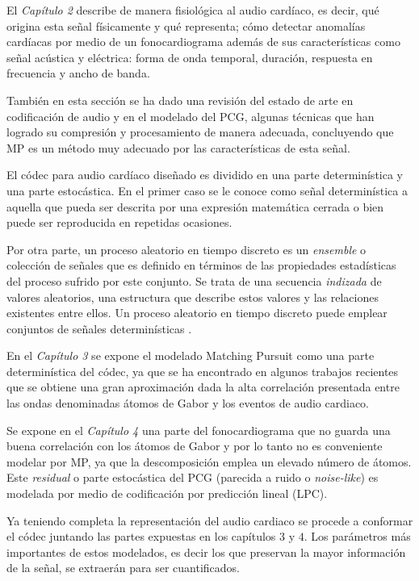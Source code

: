 El \emph{Capítulo 2} describe de manera fisiológica al audio cardíaco, es decir, qué origina esta señal físicamente y qué representa; cómo detectar anomalías cardíacas por medio de un fonocardiograma además de sus características como señal acústica y eléctrica: forma de onda temporal, duración, respuesta en frecuencia y ancho de banda. 

También en esta sección se ha dado una revisión del estado de arte en codificación de audio y en el modelado del PCG, algunas técnicas que han logrado su compresión y procesamiento de manera adecuada, concluyendo que MP es un método muy adecuado por las características de esta señal.

El códec para audio cardíaco diseñado es dividido en una parte determinística y una parte estocástica. En el primer caso se le conoce como señal determinística a aquella que pueda ser descrita por una expresión matemática cerrada o bien puede ser reproducida en repetidas ocasiones. 

Por otra parte, un proceso aleatorio en tiempo discreto es un \emph{ensemble} o colección de señales que es definido en términos de las propiedades estadísticas del proceso sufrido por este conjunto. Se trata de una secuencia \emph{indizada} de valores aleatorios, una estructura que describe estos valores y las relaciones existentes entre ellos. Un proceso aleatorio en tiempo discreto puede emplear conjuntos de señales determinísticas \cite[]{Papoulis1984}.

En el \emph{Capítulo 3} se expone el modelado Matching Pursuit como una parte determinística del códec, ya que se ha encontrado en algunos trabajos recientes que se obtiene una gran aproximación dada la alta correlación presentada entre las ondas denominadas átomos de Gabor y los eventos de audio cardiaco. 

Se expone en el \emph{Capítulo 4} una parte del fonocardiograma que no guarda una buena correlación con los átomos de Gabor y por lo tanto no es conveniente modelar por MP, ya que la descomposición emplea un elevado número de átomos. Este \emph{residual} o parte estocástica del PCG (parecida a ruido o \emph{noise-like}) es modelada por medio de codificación por predicción lineal (LPC). 

Ya teniendo completa la representación del audio cardiaco se procede a conformar el códec juntando las partes expuestas en los capítulos $3$ y $4$. Los parámetros más importantes de estos modelados, es decir los que preservan la mayor información de la señal, se extraerán para ser cuantificados.

